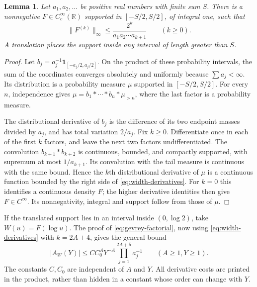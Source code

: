 \documentclass[11pt]{article}
\newtheorem{lemma}[theorem]{Lemma}
\begin{document}
\begin{lemma}\label{lem:summable-widths}
Let $a_1,a_2,\ldots$ be positive real numbers with finite sum $S$.
There is a nonnegative $F\in C_c^\infty(\mathbb R)$ supported in
$[-S/2,S/2]$, of integral one, such that
\begin{equation}\label{eq:width-derivatives}
 \|F^{(k)}\|_\infty\le
 \frac{2^k}{a_1a_2\cdots a_{k+1}}\qquad(k\ge0).
\end{equation}
A translation places the support inside any interval of length greater
than $S$.
\end{lemma}
\begin{proof}
Let $b_j=a_j^{-1}\mathbf1_{[-a_j/2,a_j/2]}$. On the product of
these probability intervals, the sum of the coordinates converges
absolutely and uniformly because $\sum a_j<\infty$. Its distribution
is a probability measure $\mu$ supported in $[-S/2,S/2]$.
For every $n$, independence gives
$\mu=b_1*\cdots*b_n*\mu_{>n}$, where the last factor is a
probability measure.

The distributional derivative of $b_j$ is the difference of its two
endpoint masses divided by $a_j$, and has total variation $2/a_j$.
Fix $k\ge0$. Differentiate once in each of the first $k$ factors,
and leave the next two factors undifferentiated. The convolution
$b_{k+1}*b_{k+2}$ is continuous, bounded, and compactly supported,
with supremum at most $1/a_{k+1}$. Its convolution with the tail
measure is continuous with the same bound. Hence the $k$th
distributional derivative of $\mu$ is a continuous function bounded
by the right side of \eqref{eq:width-derivatives}. For $k=0$ this
identifies a continuous density $F$; the higher derivative identities
then give $F\in C^\infty$. Its nonnegativity, integral and support
follow from those of $\mu$.
\end{proof}

If the translated support lies in an interval inside $(0,\log2)$,
take $W(u)=F(\log u)$. The proof of
\eqref{eq:gevrey-factorial}, now using
\eqref{eq:width-derivatives} with $k=2A+4$, gives the general bound
\begin{equation}\label{eq:width-direct-bound}
 |A_W(Y)|\le C C_0^A Y^{-A}
       \prod_{j=1}^{2A+5}a_j^{-1}\qquad(A\ge1, Y\ge1).
\end{equation}
The constants $C,C_0$ are independent of $A$ and $Y$. All derivative
costs are printed in the product, rather than hidden in a constant
whose order can change with $Y$.
\end{document}
